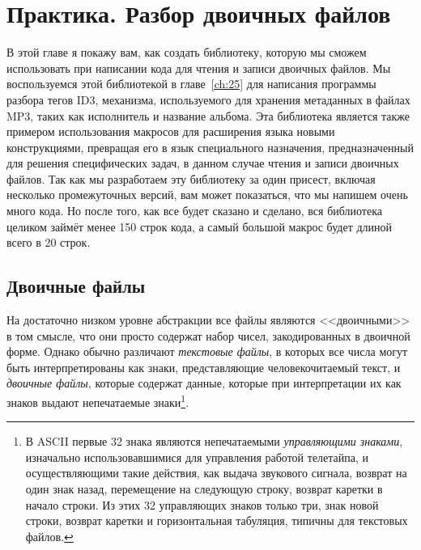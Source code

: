 \chapter{Практика. Разбор двоичных файлов}
\label{ch:24}

\thispagestyle{empty}

В этой главе я покажу вам, как создать библиотеку, которую мы сможем использовать при
написании кода для чтения и записи двоичных файлов. Мы воспользуемся этой библиотекой в
главе~\ref{ch:25} для написания программы разбора тегов ID3, механизма, используемого для
хранения метаданных в файлах MP3, таких как исполнитель и название альбома. Эта библиотека
является также примером использования макросов для расширения языка новыми конструкциями,
превращая его в язык специального назначения, предназначенный для решения специфических
задач, в данном случае чтения и записи двоичных файлов. Так как мы разработаем эту
библиотеку за один присест, включая несколько промежуточных версий, вам может показаться,
что мы напишем очень много кода. Но после того, как все будет сказано и сделано, вся
библиотека целиком займёт менее 150 строк кода, а самый большой макрос будет длиной всего
в 20 строк.

\section{Двоичные файлы}

На достаточно низком уровне абстракции все файлы являются <<двоичными>> в том смысле, что
они просто содержат набор чисел, закодированных в двоичной форме.  Однако обычно
различают \textit{текстовые файлы}, в которых все числа могут быть интерпретированы как
знаки, представляющие человекочитаемый текст, и \textit{двоичные файлы}, которые содержат
данные, которые при интерпретации их как знаков выдают непечатаемые знаки\footnote{В
  ASCII первые 32 знака являются непечатаемыми \textit{управляющими знаками}, изначально
  использовавшимися для управления работой телетайпа, и осуществляющими такие действия, как
  выдача звукового сигнала, возврат на один знак назад, перемещение на следующую строку,
  возврат каретки в начало строки. Из этих 32 управляющих знаков только три, знак новой
  строки, возврат каретки и горизонтальная табуляция, типичны для текстовых файлов.}.

